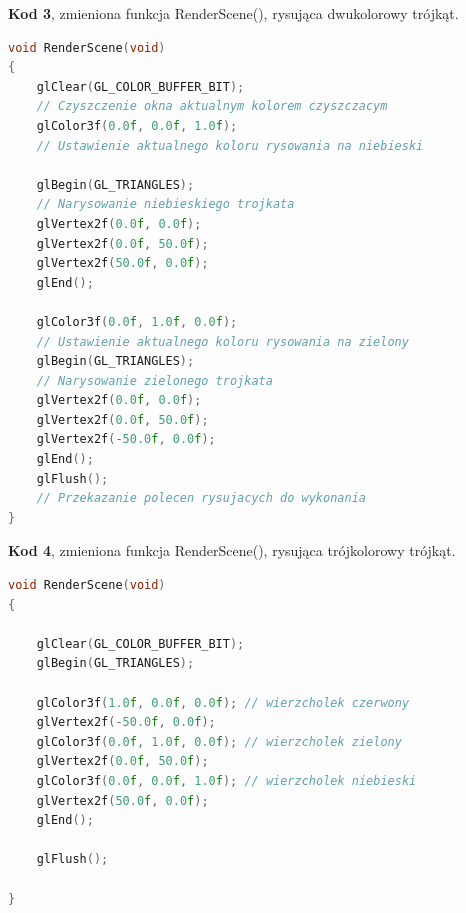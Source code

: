 \documentclass[polish,polish,a4paper]{article}
\begin{document}
\textbf{Kod 3}, zmieniona funkcja RenderScene(), rysująca dwukolorowy trójkąt.  
{\small
\begin{lstlisting}[language=C++]
void RenderScene(void)
{
	glClear(GL_COLOR_BUFFER_BIT);
	// Czyszczenie okna aktualnym kolorem czyszczacym
	glColor3f(0.0f, 0.0f, 1.0f);
	// Ustawienie aktualnego koloru rysowania na niebieski

	glBegin(GL_TRIANGLES);
	// Narysowanie niebieskiego trojkata
	glVertex2f(0.0f, 0.0f);
	glVertex2f(0.0f, 50.0f);
	glVertex2f(50.0f, 0.0f);
	glEnd();

	glColor3f(0.0f, 1.0f, 0.0f);
	// Ustawienie aktualnego koloru rysowania na zielony
	glBegin(GL_TRIANGLES);
	// Narysowanie zielonego trojkata
	glVertex2f(0.0f, 0.0f);
	glVertex2f(0.0f, 50.0f);
	glVertex2f(-50.0f, 0.0f);
	glEnd();
	glFlush();
	// Przekazanie polecen rysujacych do wykonania
}
\end{lstlisting}
}

\textbf{Kod 4}, zmieniona funkcja RenderScene(), rysująca trójkolorowy trójkąt.  
{\small
\begin{lstlisting}[language=C++]
void RenderScene(void)
{

	glClear(GL_COLOR_BUFFER_BIT);
	glBegin(GL_TRIANGLES);

	glColor3f(1.0f, 0.0f, 0.0f); // wierzcholek czerwony
	glVertex2f(-50.0f, 0.0f);
	glColor3f(0.0f, 1.0f, 0.0f); // wierzcholek zielony
	glVertex2f(0.0f, 50.0f);
	glColor3f(0.0f, 0.0f, 1.0f); // wierzcholek niebieski
	glVertex2f(50.0f, 0.0f);
	glEnd();

	glFlush();

}
\end{lstlisting}
}
\end{document}
